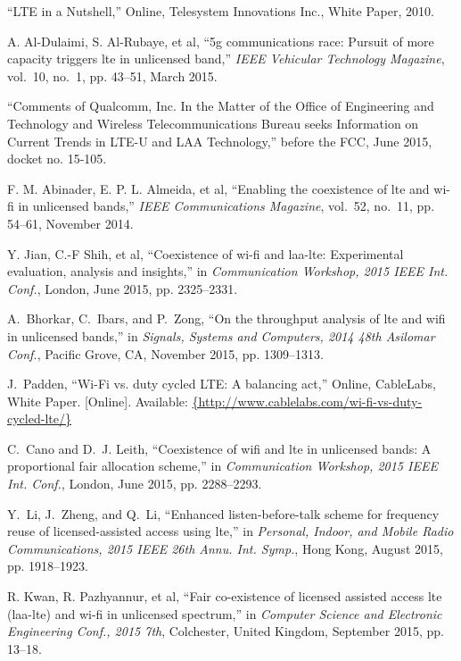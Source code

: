 \begin{thebibliography}{99.}
	 ``{LTE in a Nutshell},'' Online, Telesystem Innovations Inc., White Paper, 2010.
	
	 {A. Al-Dulaimi, S. Al-Rubaye, et al}, ``5g communications race: Pursuit of more capacity triggers lte in unlicensed band,'' \emph{IEEE Vehicular Technology Magazine}, vol.~10, no.~1, pp. 43--51, March 2015.
	
	 ``{Comments of {Q}ualcomm, {I}nc. In the Matter of the Office of Engineering and Technology and Wireless Telecommunications Bureau seeks Information on Current Trends in LTE-U and LAA Technology},'' before the FCC, June 2015, docket no. 15-105.
	
	 {F. M. Abinader, E. P. L. Almeida, et al}, ``Enabling the coexistence of lte and wi-fi in unlicensed bands,'' \emph{IEEE Communications Magazine}, vol.~52, no.~11, pp. 54--61, November 2014.
	
	 {Y. Jian, {C.-F} Shih, et al}, ``Coexistence of wi-fi and laa-lte: Experimental evaluation, analysis and insights,'' in \emph{Communication Workshop, 2015 IEEE Int. Conf.}, London, June 2015, pp. 2325--2331.
	
	 A.~Bhorkar, C.~Ibars, and P.~Zong, ``On the throughput analysis of lte and wifi in unlicensed bands,'' in \emph{Signals, Systems and Computers, 2014 48th Asilomar Conf.}, Pacific Grove, CA, November 2015, pp. 1309--1313.
	
	J.~Padden, ``{Wi-Fi vs. duty cycled LTE: A balancing act},'' Online, CableLabs, White Paper. [Online]. Available: \url{{http://www.cablelabs.com/wi-fi-vs-duty-cycled-lte/}}
	
	 C.~Cano and D.~J. Leith, ``Coexistence of wifi and lte in unlicensed bands: A proportional fair allocation scheme,'' in \emph{Communication Workshop, 2015 IEEE Int. Conf.}, London, June 2015, pp. 2288--2293.
	
	 Y.~Li, J.~Zheng, and Q.~Li, ``Enhanced listen-before-talk scheme for frequency reuse of licensed-assisted access using lte,'' in \emph{Personal, Indoor, and Mobile Radio Communications, 2015 IEEE 26th Annu. Int. Symp.}, Hong Kong, August 2015, pp. 1918--1923.
	
	 {R. Kwan, R. Pazhyannur, et al}, ``Fair co-existence of licensed assisted access lte (laa-lte) and wi-fi in unlicensed spectrum,'' in \emph{Computer Science and Electronic Engineering Conf., 2015 7th}, Colchester, United Kingdom, September 2015, pp. 13--18.
	

\end{thebibliography}
